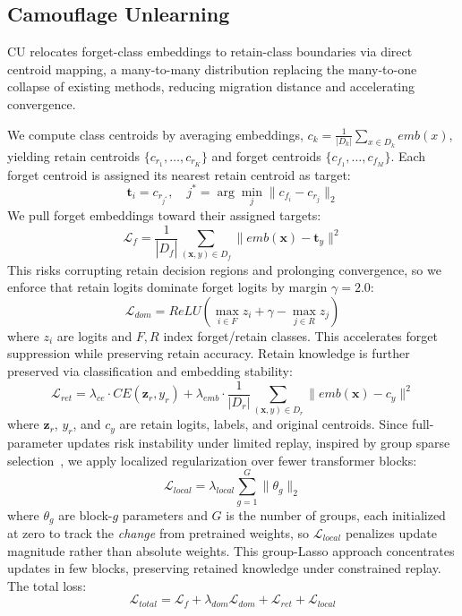 \subsection{Camouflage Unlearning}
\label{4.2}
CU relocates forget-class embeddings to retain-class boundaries via direct centroid mapping, a many-to-many distribution replacing the many-to-one collapse of existing methods, reducing migration distance and accelerating convergence.

We compute class centroids by averaging embeddings, $c_k = \frac{1}{|D_k|}\sum_{x \in D_k} \textit{emb}(x)$, yielding retain centroids $\{c_{r_1}, \dots, c_{r_K}\}$ and forget centroids $\{c_{f_1}, \dots, c_{f_M}\}$. Each forget centroid is assigned its nearest retain centroid as target:
\begin{equation}
\mathbf{t}_i = c_{r_{j^*}}, \quad j^* = \arg\min_j \|c_{f_i} - c_{r_j}\|_2
\end{equation}
We pull forget embeddings toward their assigned targets:
\begin{equation}
\mathcal{L}_{\textit{f}} = \frac{1}{|D_\textit{f}|}\sum_{(\mathbf{x}, y) \in D_\textit{f}} \|\textit{emb}(\mathbf{x}) - \mathbf{t}_y\|^2
\end{equation}
This risks corrupting retain decision regions and prolonging convergence, so we enforce that retain logits dominate forget logits by margin $\gamma = 2.0$:
\begin{equation}
\mathcal{L}_{\textit{dom}} = \textit{ReLU}\left(\max_{i \in F} z_i + \gamma - \max_{j \in R} z_j\right)
\end{equation}
where $z_i$ are logits and $F, R$ index forget/retain classes. This accelerates forget suppression while preserving retain accuracy. Retain knowledge is further preserved via classification and embedding stability:
\begin{equation}
\mathcal{L}_{\textit{ret}} = \lambda_{\textit{ce}} \cdot \textit{CE}(\mathbf{z}_r, y_r) + \lambda_{\textit{emb}} \cdot \frac{1}{|D_\textit{r}|}\sum_{(\mathbf{x}, y) \in D_\textit{r}} \|\textit{emb}(\mathbf{x}) - c_y\|^2
\end{equation}
where $\mathbf{z}_r$, $y_r$, and $c_y$ are retain logits, labels, and original centroids. Since full-parameter updates risk instability under limited replay, inspired by group sparse selection~\cite{zhao2024continual}, we apply localized regularization over fewer transformer blocks:
\begin{equation}
\mathcal{L}_{\textit{local}} = \lambda_{\textit{local}} \sum_{g=1}^{G} \|\theta_g\|_2
\end{equation}
where $\theta_g$ are block-$g$ parameters and $G$ is the number of groups, each initialized at zero to track the \emph{change} from pretrained weights, so $\mathcal{L}_{\textit{local}}$ penalizes update magnitude rather than absolute weights. This group-Lasso approach concentrates updates in few blocks, preserving retained knowledge under constrained replay. The total loss:
\begin{equation}
\mathcal{L}_{\textit{total}} = \mathcal{L}_{\textit{f}} + \lambda_{\textit{dom}} \mathcal{L}_{\textit{dom}} + \mathcal{L}_{\textit{ret}} + \mathcal{L}_{\textit{local}}
\end{equation}

